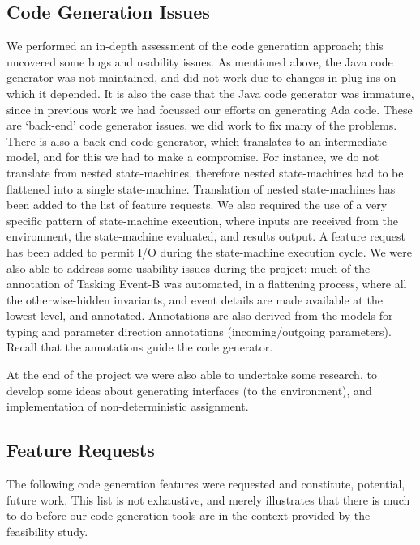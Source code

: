 \documentclass{llncs}%
\begin{document}
\subsection{Code Generation Issues}
We performed an in-depth assessment of the code generation approach; this uncovered some bugs and usability issues. As mentioned above, the Java code generator was not maintained, and did not work due to changes in plug-ins on which it depended. It is also the case that the Java code generator was immature, since in previous work we had focussed our efforts on generating Ada code. These are `back-end' code generator issues, we did work to fix many of the problems. There is also a back-end code generator, which translates to an intermediate model, and for this we had to make a compromise. For instance, we do not translate from nested state-machines, therefore nested state-machines had to be flattened into a single state-machine. Translation of nested state-machines has been added to the list of feature requests. We also required the use of a very specific pattern of state-machine execution, where inputs are received from the environment, the state-machine evaluated, and results output. A feature request has been added to permit I/O during the state-machine execution cycle. We were also able to address some usability issues during the project; much of the annotation of Tasking Event-B was automated, in a flattening process, where all the otherwise-hidden invariants, and event details are made available at the lowest level, and annotated. Annotations are also derived from the models for typing and parameter direction annotations (incoming/outgoing parameters). Recall that the annotations guide the code generator. 

At the end of the project we were also able to undertake some research, to develop some ideas about generating interfaces (to the environment), and implementation of non-deterministic assignment. 

\subsection{Feature Requests}
The following code generation features were requested and constitute, potential, future work. This list is not exhaustive, and merely illustrates that there is much to do before our code generation tools are in the context provided by the feasibility study.
\end{document}
